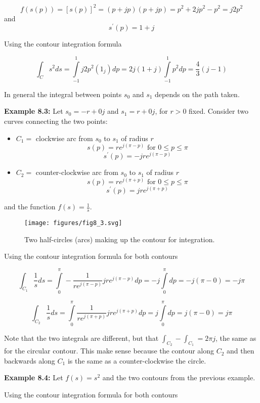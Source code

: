 \documentclass{article}
\begin{document}
\[
f\left(s(p)\right) = [s(p)]^2 = (p + jp)(p + jp) = p^2 + 2jp^2 -p^2 = j2p^2
\]
and
\[
s^\prime(p) = 1 + j
\]

Using the contour integration formula

\[
\int_C s^2 ds = \int\limits_{-1}^{1} j2p^2(1_j) dp = 2j(1+j) \int\limits_{-1}^{1} p^2 dp = \frac{4}{3} (j-1) 
\]

In general the integral between points $s_0$ and $s_1$ depends on the path taken.

\textbf{Example 8.3:} Let $s_0 = -r + 0j$ and $s_1 = r + 0j$, for $r > 0$ fixed. Consider two curves connecting the two points:

\begin{itemize}
\item $C_1 = $ clockwise arc from $s_0$ to $s_1$ of radius $r$
  \[
  s(p) = re^{j(\pi - p)} \text{ for } 0 \leq p \leq \pi  
  \]
  \[
  s^\prime(p) = -jre^{j(\pi - p)}
  \]
\item $C_2 = $ counter-clockwise arc from $s_0$ to $s_1$ of radius $r$
  \[
  s(p) = re^{j(\pi + p)} \text{ for } 0 \leq p \leq \pi
  \]
  \[
  s^\prime(p) = jre^{j(\pi + p)}
  \]
\end{itemize}

and the function $f(s) = \frac{1}{s}$.

\begin{figure}
  \centering
  \texttt{[image: figures/fig8\_3.svg]}
  \caption{Two half-circles (arcs) making up the contour for integration.}
\end{figure}

Using the contour integration formula for both contours

\[
\int_{C_1} \frac{1}{s} ds = \int\limits_{0}^{\pi} - \frac{1}{re^{j(\pi - p)}} jre^{j(\pi - p)} dp =  -j \int\limits_{0}^{\pi} dp = -j(\pi - 0) = - j\pi
\]

\[
\int_{C_2}  \frac{1}{s} ds = \int\limits_{0}^{\pi} \frac{1}{re^{j(\pi + p)}} jre^{j(\pi + p)}  dp =  j \int\limits_{0}^{\pi} dp = j(\pi - 0) = j\pi
\]

Note that the two integrals are different, but that $\int_{C_2} - \int_{C_1} = 2\pi j$, the same as for the circular contour. This make sense because the contour along $C_2$ and then backwards along $C_1$ is the same as a counter-clockwise the circle.

\textbf{Example 8.4:} Let $f(s) = s^2$ and the two contours from the previous example.

Using the contour integration formula for both contours
\end{document}
